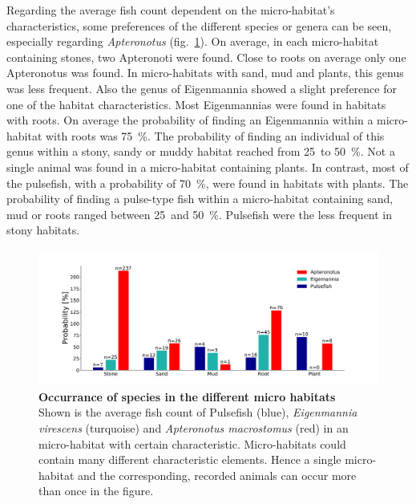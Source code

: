 
Regarding the average fish count dependent on the micro-habitat's characteristics, some preferences of the different species or genera can be seen, especially regarding \textit{Apteronotus} (fig.~\ref{fig:habitat_count_species}). On average, in each micro-habitat containing stones, two Apteronoti were found. Close to roots on average only one Apteronotus was found. In micro-habitats with sand, mud and plants, this genus was less frequent.
Also the genus of Eigenmannia showed a slight preference for one of the habitat characteristics.
Most Eigenmannias were found in habitats with roots. On average the probability of finding an Eigenmannia within a micro-habitat with roots was 75~\%. The probability of finding an individual of this genus within a stony, sandy or muddy habitat reached from 25~to 50~\%. Not a single animal was found in a micro-habitat containing plants.
In contrast, most of the pulsefish, with a probability of 70~\%, were found in habitats with plants. The probability of finding a pulse-type fish within a micro-habitat containing sand, mud or roots ranged between 25~and 50~\%. Pulsefish were the less frequent in stony habitats.

\begin{figure}[H]
    \centering
    \includegraphics[width = \textwidth]{pictures/Results/all_fish_habitat.pdf}
    \caption{\textbf{Occurrance of species in the different micro habitats}\\
    Shown is the average fish count of Pulsefish (blue), \textit{Eigenmannia virescens} (turquoise) and \textit{Apteronotus macrostomus} (red) in an micro-habitat with certain characteristic. Micro-habitats could contain many different characteristic elements. Hence a single micro-habitat and the corresponding, recorded animals can occur more than once in the figure.}
    \label{fig:habitat_count_species}
\end{figure}

